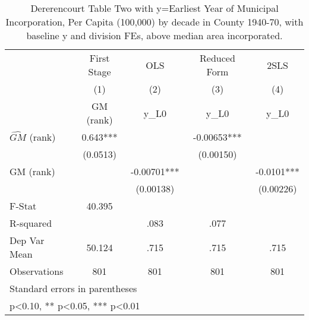 \begin{table}[htbp]\centering
\def\sym#1{\ifmmode^{#1}\else\(^{#1}\)\fi}
\caption{Dererencourt Table Two with y=Earliest Year of Municipal Incorporation, Per Capita (100,000) by decade in County 1940-70, with baseline y and division FEs, above median area incorporated.}
\begin{tabular}{l*{4}{c}}
\toprule
                    & First Stage   &         OLS   &Reduced Form   &        2SLS   \\
                    &\multicolumn{1}{c}{(1)}&\multicolumn{1}{c}{(2)}&\multicolumn{1}{c}{(3)}&\multicolumn{1}{c}{(4)}\\
                    &\multicolumn{1}{c}{GM  (rank)}&\multicolumn{1}{c}{y\_L0}&\multicolumn{1}{c}{y\_L0}&\multicolumn{1}{c}{y\_L0}\\
\midrule
$\hat{GM}$ (rank)   &       0.643***&               &    -0.00653***&               \\
                    &    (0.0513)   &               &   (0.00150)   &               \\
\addlinespace
GM  (rank)          &               &    -0.00701***&               &     -0.0101***\\
                    &               &   (0.00138)   &               &   (0.00226)   \\
\midrule
F-Stat              &      40.395   &               &               &               \\
R-squared           &               &        .083   &        .077   &               \\
Dep Var Mean        &      50.124   &        .715   &        .715   &        .715   \\
Observations        &         801   &         801   &         801   &         801   \\
\bottomrule
\multicolumn{5}{l}{\footnotesize Standard errors in parentheses}\\
\multicolumn{5}{l}{\footnotesize * p<0.10, ** p<0.05, *** p<0.01}\\
\end{tabular}
\end{table}
